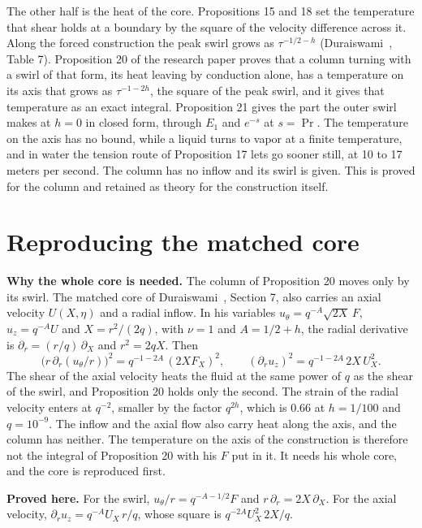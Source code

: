 The other half is the heat of the core. Propositions 15 and 18 set the temperature that shear holds
at a boundary by the square of the velocity difference across it. Along the forced construction
the peak swirl grows as $\tau^{-1/2-h}$ (Duraiswami~\cite{src:Duraiswami-2026}, Table 7).
Proposition 20 of the research paper proves that a column turning with a swirl of that form, its
heat leaving by conduction alone, has a temperature on its axis that grows as $\tau^{-1-2h}$, the
square of the peak swirl, and it gives that temperature as an exact integral. Proposition 21 gives
the part the outer swirl makes at $h = 0$ in closed form, through $E_1$ and $e^{-s}$ at
$s = \Pr$. The temperature on the axis has no bound, while a liquid turns to vapor at a finite
temperature, and in water the tension route of Proposition 17 lets go sooner still, at 10 to 17
meters per second. The column has no inflow and its swirl is given. This is proved for the column
and retained as theory for the construction itself.

\section{Reproducing the matched core}

\textbf{Why the whole core is needed.} The column of Proposition 20 moves only by its swirl.
The matched core of Duraiswami~\cite{src:Duraiswami-2026}, Section 7, also carries an axial
velocity $U(X,\eta)$ and a radial inflow. In his variables $u_\theta = q^{-A}\sqrt{2X}\,F$,
$u_z = q^{-A}U$ and $X = r^2/(2q)$, with $\nu = 1$ and $A = 1/2 + h$, the radial derivative is
$\partial_r = (r/q)\,\partial_X$ and $r^2 = 2qX$. Then
\[
\bigl(r\,\partial_r(u_\theta/r)\bigr)^2 = q^{-1-2A}\,(2XF_X)^2,
\qquad
(\partial_r u_z)^2 = q^{-1-2A}\,2X\,U_X^2 .
\]
The shear of the axial velocity heats the fluid at the same power of $q$ as the shear of the
swirl, and Proposition 20 holds only the second. The strain of the radial velocity enters at
$q^{-2}$, smaller by the factor $q^{2h}$, which is $0.66$ at $h = 1/100$ and $q = 10^{-9}$. The
inflow and the axial flow also carry heat along the axis, and the column has neither. The
temperature on the axis of the construction is therefore not the integral of Proposition 20 with
his $F$ put in it. It needs his whole core, and the core is reproduced first.

\textbf{Proved here.} For the swirl, $u_\theta/r = q^{-A-1/2}F$ and $r\,\partial_r = 2X\,\partial_X$. For
the axial velocity, $\partial_r u_z = q^{-A}U_X\,r/q$, whose square is $q^{-2A}U_X^2\,2X/q$.

